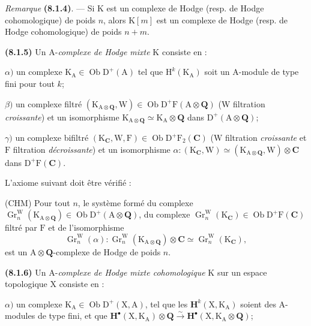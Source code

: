 \documentclass[11pt,leqno]{article}
\begin{document}
\textit{Remarque} \textbf{(8.1.4)}. — Si \(\mathrm{K}\) est un complexe de Hodge (resp. de Hodge cohomologique) de poids \(n\), alors \(\mathrm{K}[m]\) est un complexe de Hodge (resp. de Hodge cohomologique) de poids \(n+m\).

\textbf{(8.1.5)} Un \(\mathrm{A}\)-\textit{complexe de Hodge mixte} \(\mathrm{K}\) consiste en :

\(\alpha)\) un complexe \(\mathrm{K}_{\mathrm{A}}\in\operatorname{Ob}\mathrm{D}^{+}(\mathrm{A})\) tel que \(\mathrm{H}^{k}(\mathrm{K}_{\mathrm{A}})\) soit un \(\mathrm{A}\)-module de type fini pour tout \(k\);

\(\beta)\) un complexe filtré \((\mathrm{K}_{\mathrm{A}\otimes\mathbf{Q}},\mathrm{W})\in\operatorname{Ob}\mathrm{D}^{+}\mathrm{F}(\mathrm{A}\otimes\mathbf{Q})\) (\(\mathrm{W}\) filtration \textit{croissante}) et un isomorphisme \(\mathrm{K}_{\mathrm{A}\otimes\mathbf{Q}}\simeq\mathrm{K}_{\mathrm{A}}\otimes\mathbf{Q}\) dans \(\mathrm{D}^{+}(\mathrm{A}\otimes\mathbf{Q})\);

\(\gamma)\) un complexe bifiltré \((\mathrm{K}_{\mathbf{C}},\mathrm{W},\mathrm{F})\in\operatorname{Ob}\mathrm{D}^{+}\mathrm{F}_{2}(\mathbf{C})\) (\(\mathrm{W}\) filtration \textit{croissante} et \(\mathrm{F}\) filtration \textit{décroissante}) et un isomorphisme \(\alpha:(\mathrm{K}_{\mathbf{C}},\mathrm{W})\simeq(\mathrm{K}_{\mathrm{A}\otimes\mathbf{Q}},\mathrm{W})\otimes\mathbf{C}\) dans \(\mathrm{D}^{+}\mathrm{F}(\mathbf{C})\).

L’axiome suivant doit être vérifié :

(CHM) Pour tout \(n\), le système formé du complexe \(\operatorname{Gr}_{n}^{\mathrm{W}}(\mathrm{K}_{\mathrm{A}\otimes\mathbf{Q}})\in\operatorname{Ob}\mathrm{D}^{+}(\mathrm{A}\otimes\mathbf{Q})\), du complexe \(\operatorname{Gr}_{n}^{\mathrm{W}}(\mathrm{K}_{\mathbf{C}})\in\operatorname{Ob}\mathrm{D}^{+}\mathrm{F}(\mathbf{C})\) filtré par \(\mathrm{F}\) et de l’isomorphisme
\[
\operatorname{Gr}_{n}^{\mathrm{W}}(\alpha):
\operatorname{Gr}_{n}^{\mathrm{W}}(\mathrm{K}_{\mathrm{A}\otimes\mathbf{Q}})\otimes\mathbf{C}
\simeq
\operatorname{Gr}_{n}^{\mathrm{W}}(\mathrm{K}_{\mathbf{C}}),
\]
est un \(\mathrm{A}\otimes\mathbf{Q}\)-complexe de Hodge de poids \(n\).

\textbf{(8.1.6)} Un \(\mathrm{A}\)-\textit{complexe de Hodge mixte cohomologique} \(\mathrm{K}\) sur un espace topologique \(\mathrm{X}\) consiste en :

\(\alpha)\) un complexe \(\mathrm{K}_{\mathrm{A}}\in\operatorname{Ob}\mathrm{D}^{+}(\mathrm{X},\mathrm{A})\), tel que les \(\mathbf{H}^{k}(\mathrm{X},\mathrm{K}_{\mathrm{A}})\) soient des \(\mathrm{A}\)-modules de type fini, et que \(\mathbf{H}^{\bullet}(\mathrm{X},\mathrm{K}_{\mathrm{A}})\otimes\mathbf{Q}\xrightarrow{\sim}\mathbf{H}^{\bullet}(\mathrm{X},\mathrm{K}_{\mathrm{A}}\otimes\mathbf{Q})\);
\end{document}
